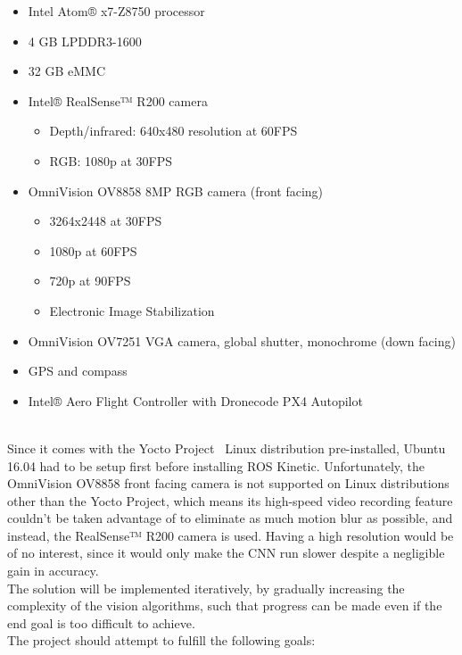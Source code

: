 \begin{itemize}
	\item{Intel Atom® x7-Z8750 processor}
	\item{4 GB LPDDR3-1600}
	\item{32 GB eMMC}
	\item{Intel® RealSense™ R200 camera}
		\begin{itemize}
			\item{Depth/infrared: 640x480 resolution at 60FPS}
			\item{RGB: 1080p at 30FPS}
		\end{itemize}
	\item{OmniVision OV8858 8MP RGB camera (front facing)}
		\begin{itemize}
			\item{3264x2448 at 30FPS}
			\item{1080p at 60FPS}
			\item{720p at 90FPS}
			\item{Electronic Image Stabilization}
		\end{itemize}
	\item{OmniVision OV7251 VGA camera, global shutter, monochrome (down facing)}
	\item{GPS and compass}
	\item{Intel® Aero Flight Controller with Dronecode PX4 Autopilot}
\end{itemize}

~\\Since it comes with the Yocto Project~\cite{Yocto} Linux distribution
pre-installed, Ubuntu 16.04 had to be setup first before installing ROS
Kinetic. Unfortunately, the OmniVision OV8858 front facing camera is not
supported on Linux distributions other than the Yocto Project, which means its
high-speed video recording feature couldn't be taken advantage of to eliminate
as much motion blur as possible, and instead, the RealSense™ R200 camera is
used. Having a high resolution would be of no interest, since it would only
make the CNN run slower despite a negligible gain in accuracy.\\


The solution will be implemented iteratively, by gradually increasing the
complexity of the vision algorithms, such that progress can be made even if the
end goal is too difficult to achieve.\\

The project should attempt to fulfill the following goals:

